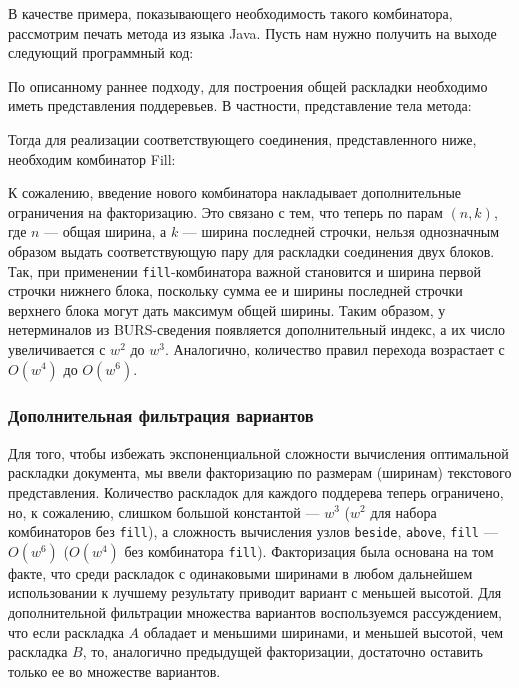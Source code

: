 В качестве примера, показывающего необходимость такого комбинатора, рассмотрим
печать метода из языка Java. Пусть нам нужно получить на выходе следующий программный
код:



По описанному раннее подходу, для построения общей раскладки необходимо иметь представления
поддеревьев. В частности, представление тела метода:



Тогда для реализации соответствующего соединения, представленного ниже,
необходим комбинатор Fill:



К сожалению, введение нового комбинатора накладывает дополнительные ограничения на
факторизацию. Это связано с тем, что теперь по парам $(n, k)$, где $n$ --- общая ширина,
а $k$ --- ширина последней строчки, нельзя однозначным образом выдать соответствующую
пару для раскладки соединения двух блоков. Так, при применении \lstinline{fill}-комбинатора
важной становится и ширина первой строчки нижнего блока, поскольку сумма ее и ширины
последней строчки верхнего блока могут дать максимум общей ширины. Таким образом,
у нетерминалов из BURS-сведения появляется дополнительный индекс, а их число
увеличивается с $w^2$ до $w^3$. Аналогично, количество правил перехода возрастает
с $O(w^4)$ до $O(w^6)$.

\subsubsection{Дополнительная фильтрация вариантов}

Для того, чтобы избежать экспоненциальной сложности вычисления оптимальной
раскладки документа, мы ввели факторизацию по размерам (ширинам) текстового
представления.
Количество раскладок для каждого поддерева теперь ограничено, но, к сожалению,
слишком большой константой --- $w^3$ ($w^2$ для набора комбинаторов без
\lstinline{fill}), а сложность вычисления узлов
\lstinline{beside}, \lstinline{above}, \lstinline{fill} --- $O(w^6)$
($O(w^4)$ без комбинатора \lstinline{fill}). Факторизация была основана на том факте, что
среди раскладок с одинаковыми ширинами в любом дальнейшем использовании
к лучшему результату приводит вариант с меньшей высотой.
Для дополнительной фильтрации множества
вариантов воспользуемся рассуждением, что если раскладка $A$ обладает и
меньшими ширинами, и меньшей высотой, чем раскладка $B$, то, аналогично
предыдущей факторизации,
достаточно оставить только ее во множестве вариантов.

